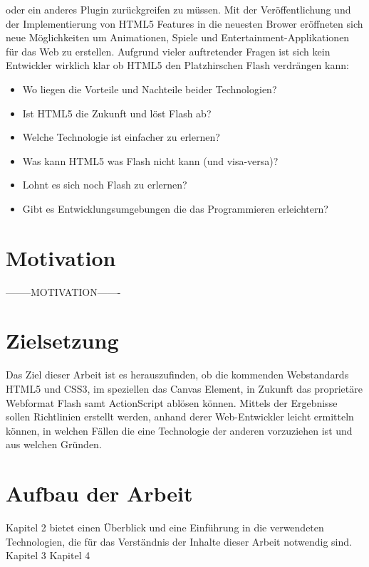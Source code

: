 oder ein anderes Plugin zurückgreifen zu müssen.
\newline\newline
Mit der Veröffentlichung und der Implementierung von HTML5 Features in die
neuesten Brower eröffneten sich neue Möglichkeiten um Animationen, Spiele und
Entertainment-Applikationen für das Web zu erstellen. Aufgrund vieler
auftretender Fragen ist sich kein Entwickler wirklich klar ob HTML5 den
Platzhirschen Flash verdrängen kann:
\begin{itemize}
	\item Wo liegen die Vorteile und Nachteile beider Technologien?
	\item Ist HTML5 die Zukunft und löst Flash ab?
	\item Welche Technologie ist einfacher zu erlernen?
	\item Was kann HTML5 was Flash nicht kann (und visa-versa)?
	\item Lohnt es sich noch Flash zu erlernen?
	\item Gibt es Entwicklungsumgebungen die das Programmieren erleichtern?
\end{itemize}
\section{Motivation}
--------MOTIVATION-------
\section{Zielsetzung}
Das Ziel dieser Arbeit ist es herauszufinden, ob die kommenden Webstandards
HTML5 und CSS3, im speziellen das Canvas Element, in Zukunft das proprietäre
Webformat Flash samt ActionScript ablösen können. Mittels der Ergebnisse sollen
Richtlinien erstellt werden, anhand derer Web-Entwickler leicht ermitteln
können, in welchen Fällen die eine Technologie der anderen vorzuziehen ist und
aus welchen Gründen.

\section{Aufbau der Arbeit}
Kapitel 2 bietet einen Überblick und eine Einführung in die verwendeten
Technologien, die für das Verständnis der Inhalte dieser Arbeit notwendig sind.
\newline\newline
Kapitel 3 
\newline\newline
Kapitel 4